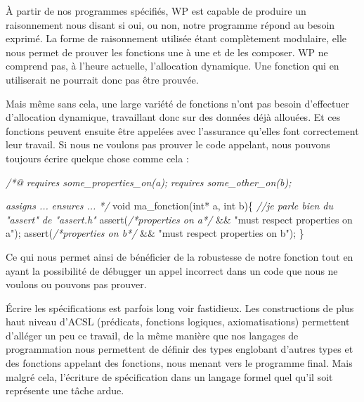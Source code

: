 \documentclass[12pt,francais,]{scrbook}
\newenvironment{Shaded}{}{}
\newcommand{\DataTypeTok}[1]{\textcolor[rgb]{0.56,0.13,0.00}{{#1}}}
\newcommand{\StringTok}[1]{\textcolor[rgb]{0.25,0.44,0.63}{{#1}}}
\newcommand{\CommentTok}[1]{\textcolor[rgb]{0.38,0.63,0.69}{\textit{{#1}}}}
\newcommand{\NormalTok}[1]{{#1}}
\begin{document}
À partir de nos programmes spécifiés, WP est capable de produire un
raisonnement nous disant si oui, ou non, notre programme répond au
besoin exprimé. La forme de raisonnement utilisée étant complètement
modulaire, elle nous permet de prouver les fonctions une à une et de les
composer. WP ne comprend pas, à l'heure actuelle, l'allocation
dynamique. Une fonction qui en utiliserait ne pourrait donc pas être
prouvée.

Mais même sans cela, une large variété de fonctions n'ont pas besoin
d'effectuer d'allocation dynamique, travaillant donc sur des données
déjà allouées. Et ces fonctions peuvent ensuite être appelées avec
l'assurance qu'elles font correctement leur travail. Si nous ne voulons
pas prouver le code appelant, nous pouvons toujours écrire quelque chose
comme cela :

\begin{footnotesize}\begin{Shaded}
\begin{Highlighting}[]
\CommentTok{/*@}
\CommentTok{  requires some_properties_on(a);}
\CommentTok{  requires some_other_on(b);}

\CommentTok{  assigns ...}
\CommentTok{  ensures ...}
\CommentTok{*/}
\DataTypeTok{void} \NormalTok{ma_fonction(}\DataTypeTok{int}\NormalTok{* a, }\DataTypeTok{int} \NormalTok{b)\{}
  \CommentTok{//je parle bien du "assert" de "assert.h"}
  \NormalTok{assert(}\CommentTok{/*properties on a*/} \NormalTok{&& }\StringTok{"must respect properties on a"}\NormalTok{);  }
  \NormalTok{assert(}\CommentTok{/*properties on b*/} \NormalTok{&& }\StringTok{"must respect properties on b"}\NormalTok{);}
\NormalTok{\}}
\end{Highlighting}
\end{Shaded}\end{footnotesize}

Ce qui nous permet ainsi de bénéficier de la robustesse de notre
fonction tout en ayant la possibilité de débugger un appel incorrect
dans un code que nous ne voulons ou pouvons pas prouver.

Écrire les spécifications est parfois long voir fastidieux. Les
constructions de plus haut niveau d'ACSL (prédicats, fonctions logiques,
axiomatisations) permettent d'alléger un peu ce travail, de la même
manière que nos langages de programmation nous permettent de définir des
types englobant d'autres types et des fonctions appelant des fonctions,
nous menant vers le programme final. Mais malgré cela, l'écriture de
spécification dans un langage formel quel qu'il soit représente une
tâche ardue.
\end{document}

